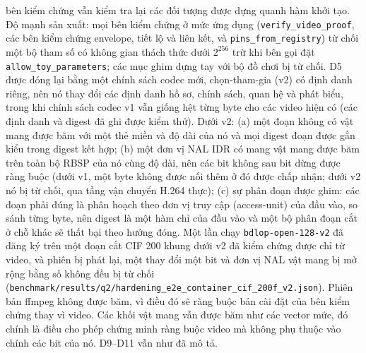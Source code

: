 bên kiểm chứng vẫn kiểm tra lại các đối tượng được dựng quanh hàm khởi tạo. Độ
mạnh sản xuất: mọi bên kiểm chứng ở mức ứng dụng (\texttt{verify\_video\_proof},
các bên kiểm chứng envelope, tiết lộ và liên kết, và
\texttt{pins\_from\_registry}) từ chối một bộ tham số có không gian thách thức
dưới $2^{256}$ trừ khi bên gọi đặt \texttt{allow\_toy\_parameters}; các mục ghim
dựng tay với bộ đồ chơi bị từ chối. D5 được đóng lại bằng một chính sách codec
mới, chọn-tham-gia (v2) có định danh riêng, nên nó thay đổi các định danh hồ sơ,
chính sách, quan hệ và phát biểu, trong khi chính sách codec v1 vẫn giống hệt
từng byte cho các video hiện có (các định danh và digest đã ghi được kiểm thử).
Dưới v2: (a) một đoạn không có vật mang được băm với một thẻ miền và độ dài của
nó và mọi digest đoạn được gắn kiểu trong digest kết hợp; (b) một đơn vị NAL IDR
có mang vật mang được băm trên toàn bộ RBSP của nó cùng độ dài, nên các bit
không sau bit dừng được ràng buộc (dưới v1, một byte không được nối thêm ở đó
được chấp nhận; dưới v2 nó bị từ chối, qua tầng vận chuyển H.264 thực); (c) sự
phân đoạn được ghim: các đoạn phải đúng là phân hoạch theo đơn vị truy cập
(access-unit) của đầu vào, so sánh từng byte, nên digest là một hàm chỉ của đầu
vào và một bộ phân đoạn cắt ở chỗ khác sẽ thất bại theo hướng đóng. Một lần chạy
\texttt{bdlop-open-128-v2} đã đăng ký trên một đoạn cắt CIF 200 khung dưới v2
đã kiểm chứng được chỉ từ video, và phiên bị phát lại, một thay đổi một bit và
đơn vị NAL vật mang bị mở rộng bằng số không đều bị từ chối
(\texttt{benchmark/results/q2/hardening\_e2e\_container\_cif\_200f\_v2.json}).
Phiên bản ffmpeg không được băm, vì điều đó sẽ ràng buộc bản cài đặt của bên
kiểm chứng thay vì video. Các khối vật mang vẫn được băm như các vector mức,
đó chính là điều cho phép chứng minh ràng buộc video mà không phụ thuộc vào
chính các bit của nó. D9--D11 vẫn như đã mô tả.
